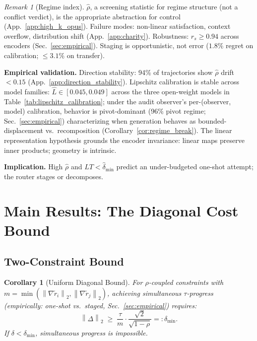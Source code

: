 \documentclass{article}
\theoremstyle{plain}
\newtheorem{corollary}[theorem]{Corollary}
\theoremstyle{definition}
\theoremstyle{remark}
\newtheorem{remark}[theorem]{Remark}
\newcommand{\norm}[1]{\left\lVert #1 \right\rVert}
\newcommand{\rhohat}{\hat{\rho}}
\newcommand{\appref}[1]{App.~\ref{#1}}
\newcommand{\secref}[1]{Sec.~\ref{#1}}
\begin{document}
\begin{remark}[Regime index]\label{rem:proxy_scope}
$\hat\rho$, a screening statistic for regime structure (not a conflict verdict), is the appropriate abstraction for control (\appref{app:high_k_opus}). Failure modes: non-linear satisfaction, context overflow, distribution shift (\appref{app:charity}). Robustness: $r_s \geq 0.94$ across encoders (\secref{sec:empirical}). Staging is opportunistic, not error ($1.8\%$ regret on calibration; $\le 3.1\%$ on transfer).
\end{remark}

\textbf{Empirical validation.}
Direction stability: 94\% of trajectories show $\rhohat$ drift ${<}0.15$ (\appref{app:direction_stability}). Lipschitz calibration is stable across model families: $\hat{L} \in [0.045, 0.049]$ across the three open-weight models in Table~\ref{tab:lipschitz_calibration}; under the audit observer's per-(observer, model) calibration, behavior is pivot-dominant (96\% pivot regime; \secref{sec:empirical}) characterizing when generation behaves as bounded-displacement vs.\ recomposition (Corollary~\ref{cor:regime_break}). The linear representation hypothesis \citep{park2023linear} grounds the encoder invariance: linear maps preserve inner products; geometry is intrinsic.

\textbf{Implication.}
High $\hat\rho$ and $LT < \widehat{\delta}_{\min}$ predict an under-budgeted one-shot attempt; the router stages or decomposes.

\section{Main Results: The Diagonal Cost Bound}\label{sec:bounds}

\subsection{Two-Constraint Bound}

\begin{corollary}[Uniform Diagonal Bound]\label{cor:uniform}
For $\rho$-coupled constraints with $m = \min(\norm{\nabla\tilde{r}_i}_2,\norm{\nabla\tilde{r}_j}_2)$, achieving \mbox{simultaneous} $\tau$-progress (empirically: one-shot vs.\ staged, \secref{sec:empirical}) requires:
\[
\norm{\Delta}_2 \;\ge\; \boxed{\frac{\tau}{m} \cdot \frac{\sqrt{2}}{\sqrt{1-\rho}}} =: \delta_{\min}.
\]
If $\delta < \delta_{\min}$, simultaneous progress is impossible.
\end{corollary}
\end{document}

